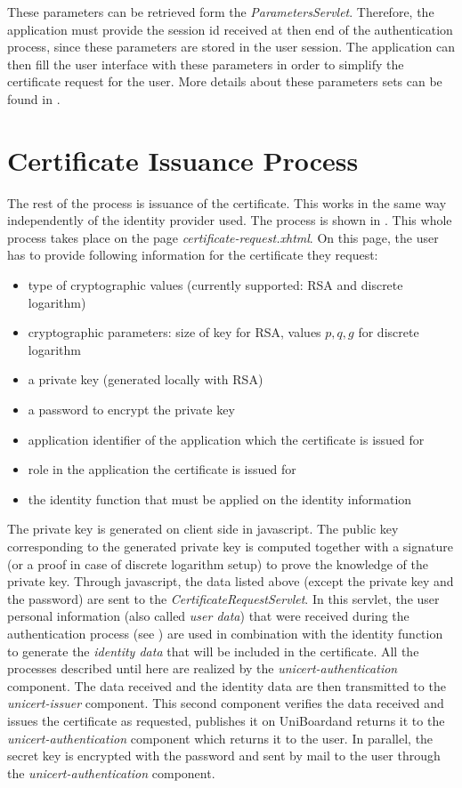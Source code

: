 \documentclass[oneside]{scrreprt}
\newcommand{\uniboard}{\mbox{UniBoard}}
\begin{document}
These parameters can be retrieved form the \textit{ParametersServlet}. Therefore, the application must provide the session id received at then end of the authentication process, since these parameters are stored in the user session. The application can then fill the user interface with these parameters in order to simplify the certificate request for the user. More details about these parameters sets can be found in .

\section{Certificate Issuance Process} \label{sec:issuance_process}

The rest of the process is issuance of the certificate. This works in the same way independently of the identity provider used. The process is shown in . This whole process takes place on the page \textit{certificate-request.xhtml}. On this page, the user has to provide following information for the certificate they request: 
\begin{itemize}
\item type of cryptographic values (currently supported: RSA and discrete logarithm)
\item cryptographic parameters: size of key for RSA, values $p,q,g$ for discrete logarithm
\item a private key (generated locally with RSA)
\item a password to encrypt the private key
\item application identifier of the application which the certificate is issued for
\item role in the application the certificate is issued for
\item the identity function that must be applied on the identity information
\end{itemize}

The private key is generated on client side in javascript. The public key corresponding to the generated private key is computed together with a signature (or a proof in case of discrete logarithm setup) to prove the knowledge of the private key. Through javascript, the data listed above (except the private key and the password) are sent to the \textit{CertificateRequestServlet}. In this servlet, the user personal information (also called \textit{user data}) that were received during the authentication process (see ) are used in combination with the identity function to generate the \textit{identity data} that will be included in the certificate. All the processes described until here are realized by the \textit{unicert-authentication} component. The data received and the identity data are then transmitted to the \textit{unicert-issuer} component. This second component verifies the data received and issues the certificate as requested, publishes it on \uniboard and returns it to the \textit{unicert-authentication} component which returns it to the user. In parallel, the secret key is encrypted with the password and sent by mail to the user through the \textit{unicert-authentication} component.
\end{document}
